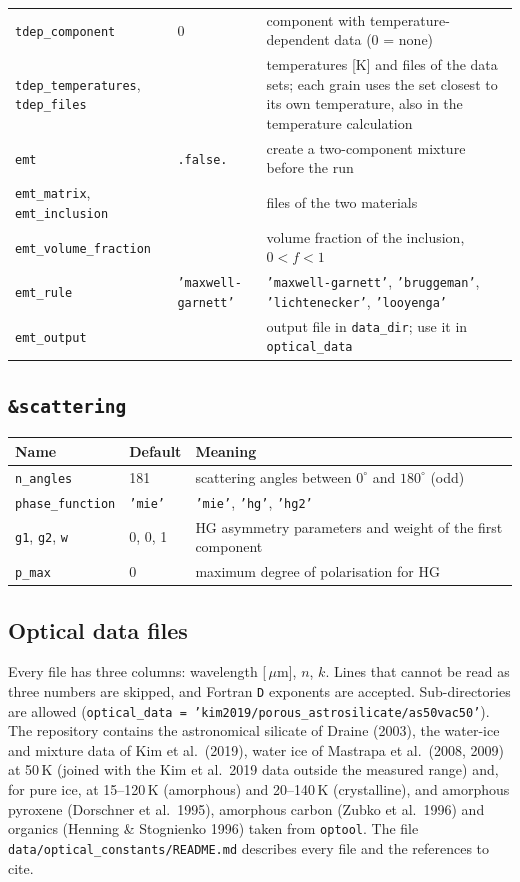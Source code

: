 \documentclass[11pt,a4paper]{article}
\newcommand{\code}[1]{\texttt{#1}}
\newcommand{\um}{\,$\mu$m}
\begin{document}
\begin{longtable}{@{}R{4.15cm}R{3.4cm}R{7.45cm}@{}}
\code{tdep\_component} & 0 & component with temperature-dependent data (0 = none) \\
\code{tdep\_temperatures}, \code{tdep\_files} & & temperatures [K] and files of the data sets; each
  grain uses the set closest to its own temperature, also in the temperature calculation \\
\code{emt} & \code{.false.} & create a two-component mixture before the run \\
\code{emt\_matrix}, \code{emt\_inclusion} & & files of the two materials \\
\code{emt\_volume\_fraction} & & volume fraction of the inclusion, $0<f<1$ \\
\code{emt\_rule} & \code{'maxwell-garnett'} & \code{'maxwell-garnett'}, \code{'bruggeman'},
  \code{'lichtenecker'}, \code{'looyenga'} \\
\code{emt\_output} & & output file in \code{data\_dir}; use it in \code{optical\_data} \\
\bottomrule
\end{longtable}
\normalsize

\subsection{\code{\&scattering}}

\small
\begin{longtable}{@{}R{4.15cm}R{3.4cm}R{7.45cm}@{}}
\toprule
Name & Default & Meaning \\
\midrule
\endhead
\code{n\_angles} & 181 & scattering angles between $0^\circ$ and $180^\circ$ (odd) \\
\code{phase\_function} & \code{'mie'} & \code{'mie'}, \code{'hg'}, \code{'hg2'} \\
\code{g1}, \code{g2}, \code{w} & 0, 0, 1 & HG asymmetry parameters and weight of the first
  component \\
\code{p\_max} & 0 & maximum degree of polarisation for HG \\
\bottomrule
\end{longtable}
\normalsize

\subsection{Optical data files}

Every file has three columns: wavelength [\um], $n$, $k$. Lines that cannot be read as three
numbers are skipped, and Fortran \code{D} exponents are accepted. Sub-directories are allowed
(\code{optical\_data = 'kim2019/porous\_astrosilicate/as50vac50'}). The repository contains the
astronomical silicate of Draine (2003), the water-ice and mixture data of Kim et al.\ (2019),
water ice of Mastrapa et al.\ (2008, 2009) at 50\,K (joined with the Kim et al.\ 2019 data outside
the measured range) and, for pure ice, at 15--120\,K (amorphous) and 20--140\,K (crystalline), and
amorphous pyroxene (Dorschner et al.\ 1995),
amorphous carbon (Zubko et al.\ 1996) and organics (Henning \& Stognienko 1996) taken from
\code{optool}. The file \code{data/optical\_constants/README.md} describes every file and the
references to cite.
\end{document}
